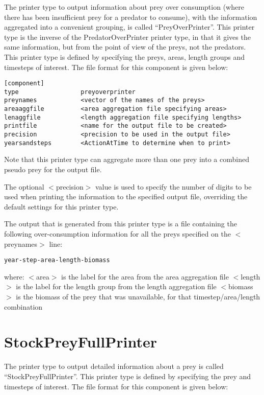 \documentclass[]{book}
\begin{document}
The printer type to output information about prey over consumption
(where there has been insufficient prey for a predator to consume), with
the information aggregated into a convenient grouping, is called
``PreyOverPrinter''. This printer type is the inverse of the
PredatorOverPrinter printer type, in that it gives the same information,
but from the point of view of the preys, not the predators. This printer
type is defined by specifying the preys, areas, length groups and
timesteps of interest. The file format for this component is given
below:

\begin{verbatim}
[component]
type                 preyoverprinter
preynames            <vector of the names of the preys>
areaaggfile          <area aggregation file specifying areas>
lenaggfile           <length aggregation file specifying lengths>
printfile            <name for the output file to be created>
precision            <precision to be used in the output file>
yearsandsteps        <ActionAtTime to determine when to print>
\end{verbatim}

Note that this printer type can aggregate more than one prey into a
combined pseudo prey for the output file.

The optional \(<\)precision\(>\) value is used to specify the number of
digits to be used when printing the information to the specified output
file, overriding the default settings for this printer type.

The output that is generated from this printer type is a file containing
the following over-consumption information for all the preys specified
on the \(<\)preynames\(>\) line:

\begin{verbatim}
year-step-area-length-biomass
\end{verbatim}

where: \(<\)area\(>\) is the label for the area from the area aggregation
file \(<\)length\(>\) is the label for the length group from the length
aggregation file \(<\)biomass\(>\) is the biomass of the prey that was
unavailable, for that timestep/area/length combination

\hypertarget{sec:stockpreyfullprinter}{%
\section{StockPreyFullPrinter}\label{sec:stockpreyfullprinter}}

The printer type to output detailed information about a prey is called
``StockPreyFullPrinter''. This printer type is defined by specifying the
prey and timesteps of interest. The file format for this component is
given below:
\end{document}
